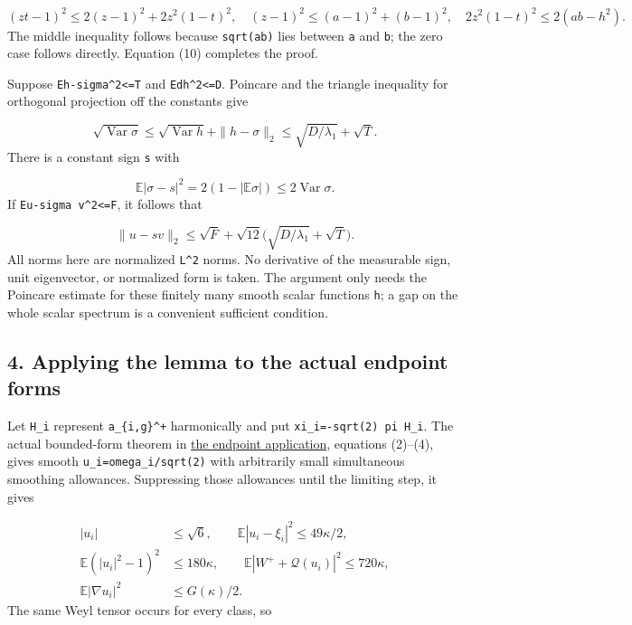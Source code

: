 \documentclass[
  11pt,
]{article}
\begin{document}
\[
 (zt-1)^2\le2(z-1)^2+2z^2(1-t)^2,
 \quad (z-1)^2\le(a-1)^2+(b-1)^2,
 \quad 2z^2(1-t)^2\le2(ab-h^2).
\] The middle inequality follows because \texttt{sqrt(ab)} lies between
\texttt{a} and \texttt{b}; the zero case follows directly. Equation (10)
completes the proof.

Suppose \texttt{E\textbar{}h-sigma\textbar{}\^{}2\textless{}=T} and
\texttt{E\textbar{}dh\textbar{}\^{}2\textless{}=D}. Poincare and the
triangle inequality for orthogonal projection off the constants give

\[
 \sqrt{\operatorname{Var}\sigma}
 \le\sqrt{\operatorname{Var}h}+\|h-\sigma\|_2
 \le\sqrt{D/\lambda_1}+\sqrt T.                  \tag{13}
\] There is a constant sign \texttt{s} with

\[
 \mathbb E|\sigma-s|^2
 =2(1-|\mathbb E\sigma|)
 \le2\operatorname{Var}\sigma.                  \tag{14}
\] If \texttt{E\textbar{}u-sigma\ v\textbar{}\^{}2\textless{}=F}, it
follows that

\[
 \|u-sv\|_2
 \le\sqrt F+\sqrt{12}\bigl(\sqrt{D/\lambda_1}+\sqrt T\bigr).
 \tag{15}
\] All norms here are normalized \texttt{L\^{}2} norms. No derivative of
the measurable sign, unit eigenvector, or normalized form is taken. The
argument only needs the Poincare estimate for these finitely many smooth
scalar functions \texttt{h}; a gap on the whole scalar spectrum is a
convenient sufficient condition.

\hypertarget{applying-the-lemma-to-the-actual-endpoint-forms}{%
\subsection{4. Applying the lemma to the actual endpoint
forms}\label{applying-the-lemma-to-the-actual-endpoint-forms}}

Let \texttt{H\_i} represent \texttt{a\_\{i,g\}\^{}+} harmonically and
put \texttt{xi\_i=-sqrt(2)\ pi\ H\_i}. The actual bounded-form theorem
in \href{line1_composed_application.md}{the endpoint application},
equations (2)--(4), gives smooth \texttt{u\_i=omega\_i/sqrt(2)} with
arbitrarily small simultaneous smoothing allowances. Suppressing those
allowances until the limiting step, it gives

\[
 \begin{split}
 |u_i|&\le\sqrt6,\qquad
 \mathbb E|u_i-\xi_i|^2\le49\kappa/2,\\
 \mathbb E(|u_i|^2-1)^2&\le180\kappa,\qquad
 \mathbb E|W^++\mathcal Q(u_i)|^2\le720\kappa,\\
 \mathbb E|\nabla u_i|^2&\le G(\kappa)/2.
 \end{split}                                                   \tag{16}
\] The same Weyl tensor occurs for every class, so
\end{document}
